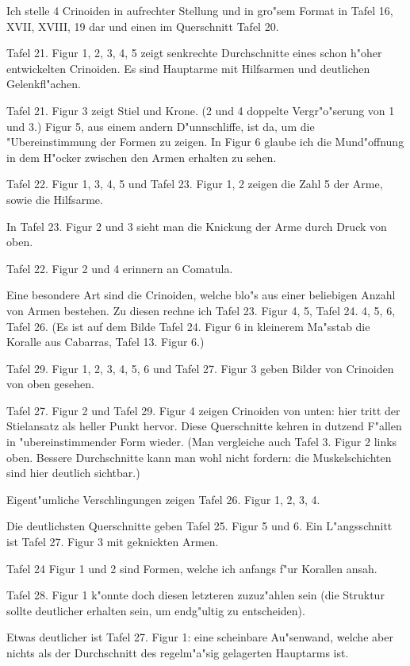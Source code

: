\documentclass[a4paper, 11pt, oneside]{article}
\begin{document}
Ich stelle 4 Crinoiden in aufrechter Stellung und in gro"sem Format in Tafel 16, XVII, XVIII, 19 dar und einen im Querschnitt Tafel 20.

Tafel 21. Figur 1, 2, 3, 4, 5 zeigt senkrechte Durchschnitte eines schon h"oher entwickelten Crinoiden. Es sind Hauptarme mit Hilfsarmen und deutlichen Gelenkfl"achen.

Tafel 21. Figur 3 zeigt Stiel und Krone. (2 und 4 doppelte Vergr"o"serung von 1 und 3.) Figur 5, aus einem andern D"unnschliffe, ist da, um die "Ubereinstimmung der Formen zu zeigen. In Figur 6 glaube ich die Mund"offnung in dem H"ocker zwischen den Armen erhalten zu sehen.

Tafel 22. Figur 1, 3, 4, 5 und Tafel 23. Figur 1, 2 zeigen die Zahl 5 der Arme, sowie die Hilfsarme.

In Tafel 23. Figur 2 und 3 sieht man die Knickung der Arme durch Druck von oben.

Tafel 22. Figur 2 und 4 erinnern an Comatula.

Eine besondere Art sind die Crinoiden, welche blo"s aus einer beliebigen Anzahl von Armen bestehen. Zu diesen rechne ich Tafel 23. Figur 4, 5, Tafel 24. 4, 5, 6, Tafel 26. (Es ist auf dem Bilde Tafel 24. Figur 6 in kleinerem Ma"sstab die Koralle aus Cabarras, Tafel 13. Figur 6.)

Tafel 29. Figur 1, 2, 3, 4, 5, 6 und Tafel 27. Figur 3 geben Bilder von Crinoiden von oben gesehen.

Tafel 27. Figur 2 und Tafel 29. Figur 4 zeigen Crinoiden von unten: hier tritt der Stielansatz als heller Punkt hervor. Diese Querschnitte kehren in dutzend F"allen in "ubereinstimmender Form wieder. (Man vergleiche auch Tafel 3. Figur 2 links oben. Bessere Durchschnitte kann man wohl nicht fordern: die Muskelschichten sind hier deutlich sichtbar.)

Eigent"umliche Verschlingungen zeigen Tafel 26. Figur 1, 2, 3, 4.

Die deutlichsten Querschnitte geben Tafel 25. Figur 5 und 6. Ein L"angsschnitt ist Tafel 27. Figur 3 mit geknickten Armen.

Tafel 24 Figur 1 und 2 sind Formen, welche ich anfangs f"ur Korallen ansah.

Tafel 28. Figur 1 k"onnte doch diesen letzteren zuzuz"ahlen sein (die Struktur sollte deutlicher erhalten sein, um endg"ultig zu entscheiden).

Etwas deutlicher ist Tafel 27. Figur 1: eine scheinbare Au"senwand, welche aber nichts als der Durchschnitt des regelm"a"sig gelagerten Hauptarms ist.
\end{document}
